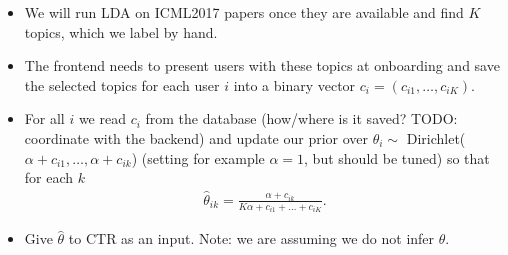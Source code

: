 \documentclass[12pt]{article}
\begin{document}
\maketitle


\begin{itemize}
\item We will run LDA on ICML2017 papers once they are available and find $K$ topics, which we label by hand.
\item The frontend needs to present users with these topics at onboarding and save the selected topics for each user $i$ into a binary vector $c_i= (c_{i1},\dots,c_{iK})$.
\item For all $i$ we read $c_i$ from the database (how/where is it saved? TODO: coordinate with the backend) and update our prior over $\theta_i \sim$ Dirichlet($ \alpha + c_{i1},\dots,\alpha + c_{ik} $) (setting for example $\alpha = 1$, but should be tuned) so that for each $k$
\begin{align*}
\hat{\theta}_{ik} = \frac{\alpha + c_{ik}}{ K \alpha + c_{i1} + \dots + c_{iK}}.
\end{align*} 
\item Give $\hat{\theta}$ to CTR as an input. Note: we are assuming we do not infer $\theta$.





\end{itemize}
\end{document}
